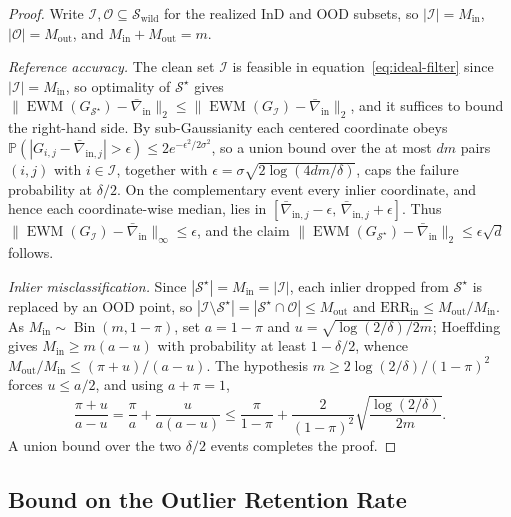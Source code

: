 \documentclass[10pt]{article} %
\def\eqref#1{equation~\ref{#1}}
\theoremstyle{plain}
\theoremstyle{definition}
\begin{document}
\begin{proof}
Write $\mathcal I,\mathcal O\subseteq\mathcal S_{\mathrm{wild}}$ for the realized InD and OOD
subsets, so $|\mathcal I|=M_{\mathrm{in}}$, $|\mathcal O|=M_{\mathrm{out}}$, and
$M_{\mathrm{in}}+M_{\mathrm{out}}=m$.

\emph{Reference accuracy.} The clean set $\mathcal I$ is feasible in
\eqref{eq:ideal-filter} since $|\mathcal I|=M_{\mathrm{in}}$, so optimality of $\mathcal S^\star$ gives
$\|\operatorname{EWM}(G_{\mathcal S^\star})-\bar\nabla_{\mathrm{in}}\|_2\le
\|\operatorname{EWM}(G_{\mathcal I})-\bar\nabla_{\mathrm{in}}\|_2$, and it suffices to bound the
right-hand side. By sub-Gaussianity each centered coordinate obeys
$\mathbb P(|G_{i,j}-\bar\nabla_{\mathrm{in},j}|>\epsilon)\le 2e^{-\epsilon^2/2\sigma^2}$, so a union
bound over the at most $dm$ pairs $(i,j)$ with $i\in\mathcal I$, together with
$\epsilon=\sigma\sqrt{2\log(4dm/\delta)}$, caps the failure probability at $\delta/2$. On the
complementary event every inlier coordinate, and hence each coordinate-wise median, lies in
$[\bar\nabla_{\mathrm{in},j}-\epsilon,\,\bar\nabla_{\mathrm{in},j}+\epsilon]$. Thus
$\|\operatorname{EWM}(G_{\mathcal I})-\bar\nabla_{\mathrm{in}}\|_\infty\le\epsilon$, and the claim
$\|\operatorname{EWM}(G_{\mathcal S^\star})-\bar\nabla_{\mathrm{in}}\|_2\le\epsilon\sqrt d$ follows.

\emph{Inlier misclassification.} Since $|\mathcal S^\star|=M_{\mathrm{in}}=|\mathcal I|$, each inlier
dropped from $\mathcal S^\star$ is replaced by an OOD point, so
$|\mathcal I\setminus\mathcal S^\star|=|\mathcal S^\star\cap\mathcal O|\le M_{\mathrm{out}}$ and
$\mathrm{ERR}_{\mathrm{in}}\le M_{\mathrm{out}}/M_{\mathrm{in}}$. As $M_{\mathrm{in}}\sim\operatorname{Bin}(m,1-\pi)$,
set $a=1-\pi$ and $u=\sqrt{\log(2/\delta)/2m}$; Hoeffding gives $M_{\mathrm{in}}\ge m(a-u)$ with
probability at least $1-\delta/2$, whence $M_{\mathrm{out}}/M_{\mathrm{in}}\le(\pi+u)/(a-u)$. The
hypothesis $m\ge 2\log(2/\delta)/(1-\pi)^2$ forces $u\le a/2$, and using $a+\pi=1$,
\[
\frac{\pi+u}{a-u}=\frac{\pi}{a}+\frac{u}{a(a-u)}
\le\frac{\pi}{1-\pi}+\frac{2}{(1-\pi)^2}\sqrt{\frac{\log(2/\delta)}{2m}}.
\]
A union bound over the two $\delta/2$ events completes the proof.
\end{proof}

\subsection{Bound on the Outlier Retention Rate}
\label{sec:err_out_proof}
\end{document}
